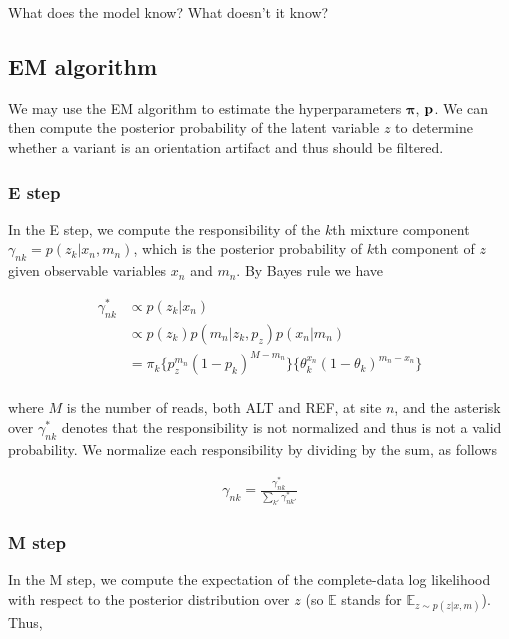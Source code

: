 \documentclass[a4paper]{article}
\newcommand{\vp}{{\bf p}}
\newcommand{\vpi}{{\bm \pi}}
\newcommand{\E}{\mathbb{E}}
\begin{document}
What does the model know? What doesn't it know? 

\subsection{EM algorithm}
We may use the EM algorithm to estimate the hyperparameters $\vpi$, $\vp$. We can then compute the posterior probability of the latent variable $z$ to determine whether a variant is an orientation artifact and thus should be filtered.

\subsubsection{E step}
In the E step, we compute the responsibility of the $k$th mixture component $\gamma_{nk} = p(z_k | x_n, m_n)$, which is the posterior probability of $k$th component of $z$ given observable variables $x_n$ and $m_n$. By Bayes rule we have

\begin{align}
\gamma^*_{nk} &\propto p(z_{k} | x_n) \\
		        &\propto p(z_{k}) p(m_n | z_k, p_{z} ) p(x_n | m_n ) \\
		        &= \pi_k  \{ p_{z}^{m_n} (1-p_k)^{M - m_n} \} \{ \theta_k^{x_n} (1 - \theta_k)^{m_n - x_n} \} \\
\end{align}

where $M$ is the number of reads, both ALT and REF, at site $n$, and the asterisk over $\gamma^*_{nk}$ denotes that the responsibility is not normalized and thus is not a valid probability. We normalize each responsibility by dividing by the sum, as follows

\begin{align}
\gamma_{nk} = \frac{\gamma^*_{nk}}{\sum_{k'} \gamma^*_{nk'}}
\end{align}

\subsubsection{M step}
In the M step, we compute the expectation of the complete-data log likelihood with respect to the posterior distribution over $z$ (so $\E$ stands for $\E_{z \sim p(z|x,m)}$). Thus,
\end{document}
